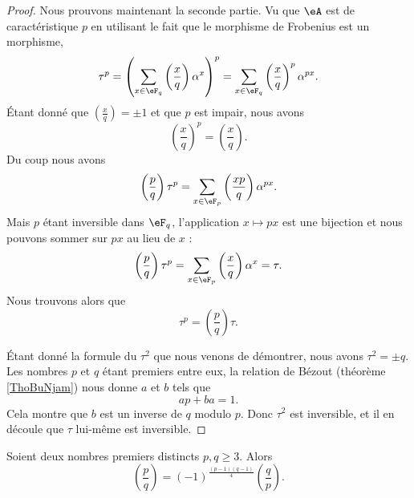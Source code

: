 \begin{proof}
    Nous prouvons maintenant la seconde partie. Vu que \( \eA\) est de caractéristique \( p\) en utilisant le fait que le morphisme de Frobenius est un morphisme,
    \begin{equation}
        \tau^p=\left( \sum_{x\in \eF_q}\left(\frac{x}{q}\right)\alpha^x \right)^p=\sum_{x\in \eF_q}\left(\frac{x}{q}\right)^p\alpha^{px}.
    \end{equation}
    Étant donné que \( \left(\frac{x}{q}\right)=\pm 1\) et que \( p\) est impair, nous avons
    \begin{equation}
        \left(\frac{x}{q}\right)^p=\left(\frac{x}{q}\right).
    \end{equation}
    Du coup nous avons
    \begin{equation}
        \left(\frac{p}{q}\right)\tau^p=\sum_{x\in \eF_p}\left(\frac{xp}{q}\right)\alpha^{px}.
    \end{equation}
    Mais \( p\) étant inversible dans \( \eF_q\), l'application \( x\mapsto px\) est une bijection et nous pouvons sommer sur \( px\) au lieu de \( x\) :
    \begin{equation}
        \left(\frac{p}{q}\right)\tau^p=\sum_{x\in \eF_p}\left(\frac{x}{q}\right)\alpha^x=\tau.
    \end{equation}
    Nous trouvons alors que
    \begin{equation}
        \tau^p=\left(\frac{p}{q}\right)\tau.
    \end{equation}

    Étant donné la formule du \( \tau^2\) que nous venons de démontrer, nous avons \( \tau^2=\pm q\). Les nombres \( p\) et \( q\) étant premiers entre eux, la relation de Bézout (théorème \ref{ThoBuNjam}) nous donne \( a\) et \( b\) tels que
    \begin{equation}
        ap+ba=1.
    \end{equation}
    Cela montre que \( b\) est un inverse de \( q\) modulo \( p\). Donc \( \tau^2\) est inversible, et il en découle que \( \tau\) lui-même est inversible.
\end{proof}

\begin{theorem}  \label{ThoMiEiUm}
    Soient deux nombres premiers distincts \( p,q\geq 3\). Alors
    \begin{equation}
        \left(\frac{p}{q}\right)=(-1)^{\frac{ (p-1)(q-1) }{ 4 }}\left(\frac{q}{p}\right).
    \end{equation}
\end{theorem}

